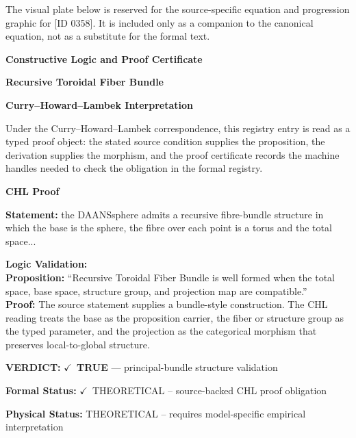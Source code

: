 \begingroup\footnotesize\sloppy
The visual plate below is reserved for the source-specific equation and progression graphic for [ID 0358]. It is included only as a companion to the canonical equation, not as a substitute for the formal text.
\par\endgroup
\ifTZPDarkEdition
{}
\fi

\clearpage
\begingroup\tzpsupportsetup
\noindent\textbf{\fontsize{10.8pt}{12.8pt}\selectfont [ID 0358] Constructive Logic and Proof Certificate}\par
\noindent\textbf{\fontsize{10pt}{12pt}\selectfont Recursive Toroidal Fiber Bundle}\par
\vspace{0.45em}
\begingroup
\footnotesize
\setlength{\parskip}{0.22em}
\setlength{\parindent}{0pt}
\noindent\textbf{Curry--Howard--Lambek Interpretation}\par
Under the Curry--Howard--Lambek correspondence, this registry entry is read as a typed proof
object: the stated source condition supplies the proposition, the derivation supplies the
morphism, and the proof certificate records the machine handles needed to check the obligation
in the formal registry.

\vspace{0.45em}
\noindent\textbf{CHL Proof}\par
\textbf{Statement:} the DAANSsphere admits a recursive fibre-bundle structure in which the base is the
sphere, the fibre over each point is a torus and the total space...

\textbf{Logic Validation:}\\
\textbf{Proposition:} ``Recursive Toroidal Fiber Bundle is well formed when the total space, base space,
structure group, and projection map are compatible.''\\
\textbf{Proof:} The source statement supplies a bundle-style construction. The CHL reading treats the
base as the proposition carrier, the fiber or structure group as the typed parameter,
and the projection as the categorical morphism that preserves local-to-global structure.

\textbf{VERDICT:} \ensuremath{\checkmark}\ \textbf{TRUE} --- principal-bundle structure validation

\textbf{Formal Status:} \ensuremath{\checkmark}\ THEORETICAL -- source-backed CHL proof obligation

\textbf{Physical Status:} THEORETICAL -- requires model-specific empirical interpretation
\par\vspace{0.45em}
\par
\ifTZPDarkEdition
{}
\fi
\endgroup
\endgroup
